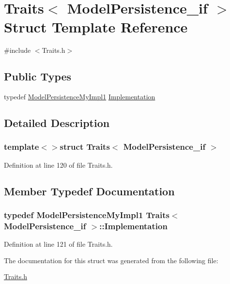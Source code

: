 \hypertarget{struct_traits_3_01_model_persistence__if_01_4}{\section{Traits$<$ Model\-Persistence\-\_\-if $>$ Struct Template Reference}
\label{struct_traits_3_01_model_persistence__if_01_4}
}


{\ttfamily \#include $<$Traits.\-h$>$}

\subsection*{Public Types}
\begin{DoxyCompactItemize}
\item 
typedef \hyperlink{class_model_persistence_my_impl1}{Model\-Persistence\-My\-Impl1} \hyperlink{struct_traits_3_01_model_persistence__if_01_4_aab21a3f51580006b6926b0ee0e4d6302}{Implementation}
\end{DoxyCompactItemize}


\subsection{Detailed Description}
\subsubsection*{template$<$$>$struct Traits$<$ Model\-Persistence\-\_\-if $>$}



Definition at line 120 of file Traits.\-h.



\subsection{Member Typedef Documentation}
\hypertarget{struct_traits_3_01_model_persistence__if_01_4_aab21a3f51580006b6926b0ee0e4d6302}{
\subsubsection[{Implementation}]{\setlength{\rightskip}{0pt plus 5cm}typedef {\bf Model\-Persistence\-My\-Impl1} {\bf Traits}$<$ {\bf Model\-Persistence\-\_\-if} $>$\-::{\bf Implementation}}}\label{struct_traits_3_01_model_persistence__if_01_4_aab21a3f51580006b6926b0ee0e4d6302}


Definition at line 121 of file Traits.\-h.



The documentation for this struct was generated from the following file\-:\begin{DoxyCompactItemize}
\item 
\hyperlink{_traits_8h}{Traits.\-h}\end{DoxyCompactItemize}
